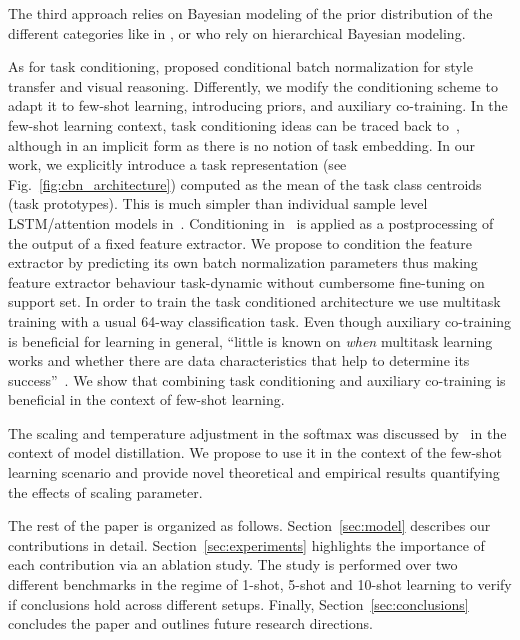\documentclass{article}
\begin{document}
The third approach relies on Bayesian modeling of the prior distribution of the different categories like in \citet{fei2006one, Bauer2017discriminative}, or \citet{lake2013one, edwards2016towards, Lacoste2018deepprior} who rely on hierarchical Bayesian modeling.

As for task conditioning, \cite{Dumoulin2017learned, Perez2017LearningVR, perez2017film} proposed conditional batch normalization for style transfer and visual reasoning. Differently, we modify the conditioning scheme to adapt it to few-shot learning, introducing  priors, and auxiliary co-training. In the few-shot learning context, task conditioning ideas can be traced back to~\citep{vinyals2016matching}, although in an implicit form as there is no notion of task embedding. In our work, we explicitly introduce a task representation (see Fig.~\ref{fig:cbn_architecture}) computed as the mean of the task class centroids (task prototypes). This is much simpler than individual sample level LSTM/attention models in~\citep{vinyals2016matching}. Conditioning in~\citep{vinyals2016matching} is applied as a postprocessing of the output of a fixed feature extractor. We propose to condition the feature extractor by predicting its own batch normalization parameters thus making feature extractor behaviour task-dynamic without cumbersome fine-tuning on support set. In order to train the task conditioned architecture we use multitask training with a usual 64-way classification task. Even though auxiliary co-training is beneficial for learning in general, ``little is known on \emph{when} multitask learning works and whether there are data characteristics that help to determine its success''~\citep{plank2017when}. We show that combining task conditioning and auxiliary co-training is beneficial in the context of few-shot learning.

The scaling and temperature adjustment in the softmax was discussed by~\citet{hinton2015distilling} in the context of model distillation. We propose to use it in the context of the few-shot learning scenario and provide novel theoretical and empirical results quantifying the effects of scaling parameter.

The rest of the paper is organized as follows. Section~\ref{sec:model} describes our contributions in detail. Section~\ref{sec:experiments} highlights the importance of each contribution via an ablation study. The study is performed over two different benchmarks in the regime of 1-shot, 5-shot and 10-shot learning to verify if conclusions hold across different setups. Finally, Section~\ref{sec:conclusions} concludes the paper and outlines future research directions.
\end{document}
